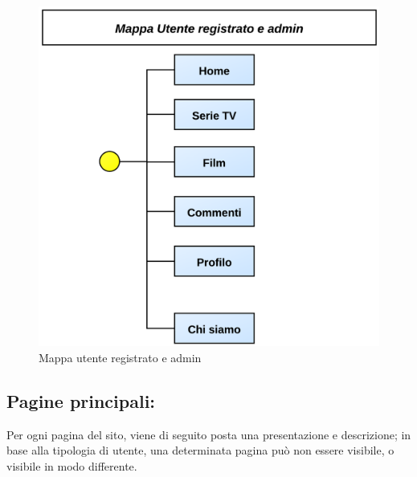 \begin{itemize}
\begin{center}
\begin{figure}[H]
\centering
\includegraphics[scale=0.60]{images/mapRegistrato.png}
\caption{Mappa utente registrato e admin}
\end{figure}
\end{center}


\end{itemize}


\subsection{Pagine principali:}
Per ogni pagina del sito, viene di seguito posta una presentazione e descrizione; in base alla tipologia di utente, una determinata pagina può non essere visibile, o visibile in modo differente.

